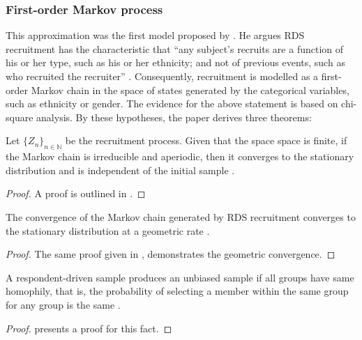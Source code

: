 \subsubsection{First-order Markov process}
\label{sec:first-order-markov-process}

This approximation was the first model proposed by \textcite{heckathorn1997}. 
He argues RDS recruitment has the characteristic that ``any subject's recruits are
a function of his or her type, such as his or her ethnicity; and not of
previous events, such as who recruited the recruiter'' \cite[p. 182]{heckathorn1997}. Consequently, 
recruitment is modelled as a first-order Markov chain in the space of states
generated by the categorical variables, such as ethnicity or gender. The
evidence for the above statement is based on chi-square analysis. By these
hypotheses, the paper derives three theorems: 

\begin{theorem} 
    Let $\{Z_n\}_{n \in \mathbb{N}}$ be the recruitment process. Given that
    the space space is finite, if the Markov chain is irreducible and
    aperiodic, then it converges to the stationary distribution and is
    independent of the initial sample \cite[p. 183]{heckathorn1997}. 
\end{theorem}

\begin{proof}
   A proof is outlined in \cite[p. 52-53]{levin2017markov}. 
\end{proof}

\begin{theorem}
    The convergence of the Markov chain generated by RDS recruitment converges
    to the stationary distribution at a geometric rate \cite[p. 186]{heckathorn1997}.
\end{theorem}

\begin{proof}
    The same proof given in \cite[p. 52-53]{levin2017markov}, demonstrates the
    geometric convergence.
\end{proof}

\begin{theorem}
  A respondent-driven sample produces an unbiased sample if all groups have
  same homophily, that is, the probability of selecting a member within the
  same group for any group is the same \cite[p. 192]{heckathorn1997}.
\end{theorem}

\begin{proof}
  \textcite[p. 191 - 192]{heckathorn1997} presents a proof for this fact. 
\end{proof}

